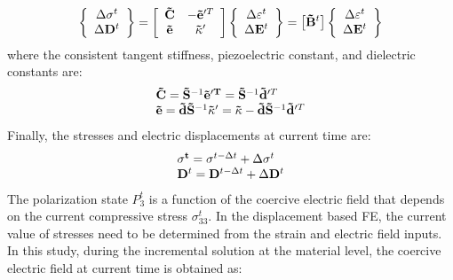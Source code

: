 \begin{equation}  
\left\{ {\begin{array}{*{20}{c}}
{\Delta {{\mathbf{\sigma }}^t}}\\
{\Delta {{\bf{D}}^t}}
\end{array}} \right\} = \left[ {\begin{array}{*{20}{c}}
{{\bf{\tilde C}}}&{ - {\bf{\tilde e}}{'^T}}\\
{{\bf{\tilde e}}}&{{\bf{\tilde \kappa }}'}
\end{array}} \right]\left\{ {\begin{array}{*{20}{c}}
{\Delta {{\mathbf{\varepsilon }}^t}}\\
{\Delta {{\bf{E}}^t}}
\end{array}} \right\} = \left[ {{{{\bf{\tilde B}}}^t}} \right]\left\{ {\begin{array}{*{20}{c}}
{\Delta {{\mathbf{\varepsilon }}^t}}\\
{\Delta {{\bf{E}}^t}}
\end{array}} \right\}
\label{EQN:linearized_polarization_const_derivative_rewritten} 
\end{equation} 
where the consistent tangent stiffness, piezoelectric constant, and dielectric constants are:
\begin{equation}  
\begin{array}{l}
{\bf{\tilde C}} = {{{\bf{\tilde S}}}^{ - 1}}{\rm{               }}{\bf{\tilde e}}{'^{\bf{T}}} = {{{\bf{\tilde S}}}^{ - 1}}{\bf{\tilde d}}{'^T}{\rm{   }}\\
{\bf{\tilde e}} = {\bf{\tilde d}}{{{\bf{\tilde S}}}^{ - 1}}{\rm{              }}{\bf{\tilde \kappa }}' = {\bf{\tilde \kappa }} - {\bf{\tilde d}}{{{\bf{\tilde S}}}^{ - 1}}{\bf{\tilde d}}{'^T}
\end{array}
\label{EQN:tanget_piezoelectric}
\end{equation} 
Finally, the stresses and electric displacements at current time are:
\begin{equation}  
\begin{array}{l}
\mathbf{{\bf{\sigma }}^t} = {{\mathbf{\sigma }}^{t - \Delta t}} + \Delta {{\mathbf{\sigma }}^t}\\
{{\bf{D}}^t} = {{\bf{D}}^{t - \Delta t}} + \Delta {{\bf{D}}^t}
\end{array}
\label{EQN:stress_and_electric_displacement}
\end{equation} 
The polarization state $P^t_3$ is a function of the coercive electric field that depends on the current compressive stress $\sigma^t_{33}$. 
In the displacement based FE, the current value of stresses need to be determined from the strain and electric field inputs. 
In this study, during the incremental solution at the material level, the coercive electric field at current time is obtained as:



